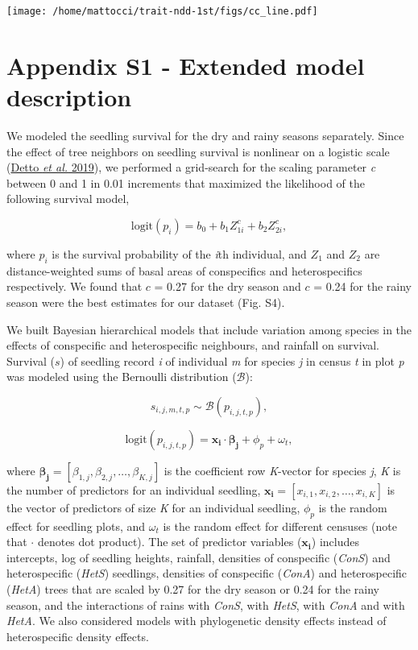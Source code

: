 \documentclass[
  12pt,
  letterpaper,
  DIV=11,
  numbers=noendperiod]{scrartcl}
\begin{document}
\texttt{[image: /home/mattocci/trait-ndd-1st/figs/cc\_line.pdf]}

\newpage

\hypertarget{appendix-s1---extended-model-description}{%
\section{Appendix S1 - Extended model
description}\label{appendix-s1---extended-model-description}}

We modeled the seedling survival for the dry and rainy seasons
separately. Since the effect of tree neighbors on seedling survival is
nonlinear on a logistic scale (\protect\hyperlink{ref-Detto2019}{Detto
\emph{et al.} 2019}), we performed a grid-search for the scaling
parameter \emph{c} between 0 and 1 in 0.01 increments that maximized the
likelihood of the following survival model,

\[
\mathrm{logit}(p_i) = b_0 + b_1 Z_{1i}^c + b_2 Z_{2i}^c,
\]

where \(p_i\) is the survival probability of the \emph{i}th individual,
and \(Z_1\) and \(Z_2\) are distance-weighted sums of basal areas of
conspecifics and heterospecifics respectively. We found that \(c\) =
0.27 for the dry season and \(c\) = 0.24 for the rainy season were the
best estimates for our dataset (Fig. S4).

We built Bayesian hierarchical models that include variation among
species in the effects of conspecific and heterospecific neighbours, and
rainfall on survival. Survival (\(s\)) of seedling record \emph{i} of
individual \emph{m} for species \emph{j} in census \emph{t} in plot
\emph{p} was modeled using the Bernoulli distribution (\(\mathcal{B}\)):

\[
s_{i,j,m,t,p} \sim \mathcal{B}(p_{i, j, t, p}),
\]

\[
\mathrm{logit}(p_{i,j,t,p}) = \boldsymbol{x_{i}} \cdot \boldsymbol{\beta_{j}} + \phi_p + \omega_t,
\]

where
\(\boldsymbol{\beta_{j}} = \left[\beta_{1,j}, \beta_{2,j}, \ldots, \beta_{K,j} \right]\)
is the coefficient row \emph{K}-vector for species \emph{j}, \emph{K} is
the number of predictors for an individual seedling,
\(\boldsymbol{x_i} = \left[x_{i,1},x _{i,2}, \ldots,x_{i,K} \right]\) is
the vector of predictors of size \emph{K} for an individual seedling,
\(\phi_p\) is the random effect for seedling plots, and \(\omega_t\) is
the random effect for different censuses (note that \(\cdot\) denotes
dot product). The set of predictor variables (\(\boldsymbol{x_i}\))
includes intercepts, log of seedling heights, rainfall, densities of
conspecific (\emph{ConS}) and heterospecific (\emph{HetS}) seedlings,
densities of conspecific (\emph{ConA}) and heterospecific (\emph{HetA})
trees that are scaled by 0.27 for the dry season or 0.24 for the rainy
season, and the interactions of rains with \emph{ConS}, with
\emph{HetS}, with \emph{ConA} and with \emph{HetA}. We also considered
models with phylogenetic density effects instead of heterospecific
density effects.
\end{document}

